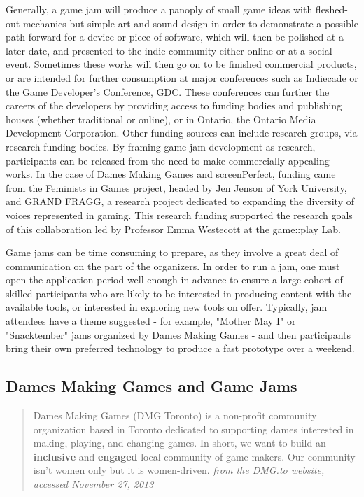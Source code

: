 Generally, a game jam will produce a panoply of small game ideas with fleshed-out mechanics but simple art and sound design in order to demonstrate a possible path forward for a device or piece of software, which will then be polished at a later date, and presented to the indie community either online or at a social event. Sometimes these works will then go on to be finished commercial products, or are intended for further consumption at major conferences such as Indiecade or the Game Developer's Conference, GDC. These conferences can further the careers of the developers by providing access to funding bodies and publishing houses (whether traditional or online), or in Ontario, the Ontario Media Development Corporation. Other funding sources can include research groups, via research funding bodies. By framing game jam development as research, participants can be released from the need to make commercially appealing works. In the case of Dames Making Games and screenPerfect, funding came from the Feminists in Games project, headed by Jen Jenson of York University, and GRAND FRAGG, a research project dedicated to expanding the diversity of voices represented in gaming. This research funding supported the research goals of this collaboration led by Professor Emma Westecott at the game::play Lab.

Game jams can be time consuming to prepare, as they involve a great deal of communication on the part of the organizers. In order to run a jam, one must open the application period well enough in advance to ensure a large cohort of skilled participants who are likely to be interested in producing content with the available tools, or interested in exploring new tools on offer. Typically, jam attendees have a theme suggested - for example, "Mother May I" or "Snacktember" jams organized by Dames Making Games - and then participants bring their own preferred technology to produce a fast prototype over a weekend.

\subsection{Dames Making Games and Game Jams}
\begin{quote}
Dames Making Games (DMG Toronto) is a non-profit community organization based in Toronto dedicated to supporting dames interested in making, playing, and changing games. In short, we want to build an \textbf{inclusive} and \textbf{engaged} local community of game-makers. Our community isn't women only but it is women-driven.
\textit{from the DMG.to website, accessed November 27, 2013}
\end{quote}

